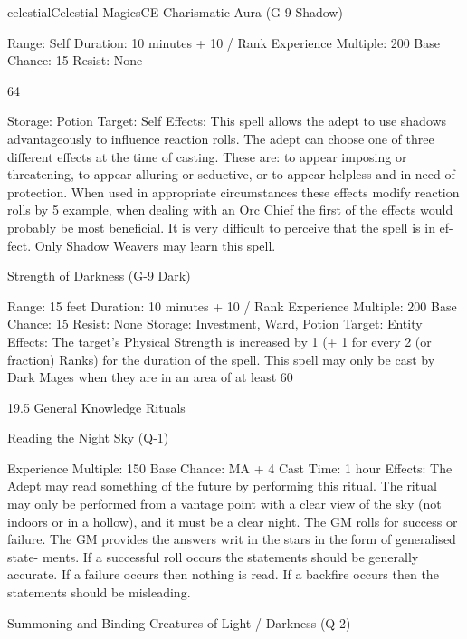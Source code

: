 \begin{College}[1.3]{celestial}{Celestial Magics}{CE}
Charismatic Aura (G-9 Shadow) 

Range: Self 
Duration: 10 minutes + 10 / Rank 
Experience Multiple: 200 
Base Chance: 15%
Resist: None 

64 

Storage: Potion 
Target: Self 
Effects: This spell allows the adept to use shadows 
advantageously  to  influence  reaction  rolls.  The 
adept  can  choose  one  of  three  different  effects  at 
the  time  of  casting.  These  are:  to  appear  imposing 
or threatening, to appear alluring or seductive, or to 
appear  helpless  and  in  need  of  protection.  When 
used  in  appropriate  circumstances  these  effects 
modify  reaction  rolls  by  5%
example,  when dealing with an Orc Chief the first 
of the effects would probably be most beneficial. It 
is  very  difficult  to  perceive  that  the  spell  is  in  ef-
fect. Only Shadow Weavers may learn this spell. 

Strength of Darkness (G-9 Dark) 

Range: 15 feet 
Duration: 10 minutes + 10 / Rank 
Experience Multiple: 200 
Base Chance: 15%
Resist: None 
Storage: Investment, Ward, Potion 
Target: Entity 
Effects: The target’s Physical Strength is increased 
by  1  (+  1  for  every  2  (or  fraction)  Ranks)  for  the 
duration  of  the  spell.  This  spell  may  only  be  cast 
by Dark Mages when they are in an area of at least 
60%

19.5 General Knowledge Rituals  

Reading the Night Sky (Q-1) 

Experience Multiple: 150 
Base Chance: MA + 4%
Cast Time: 1 hour 
Effects:  The  Adept  may  read  something  of  the 
future  by  performing  this  ritual.  The  ritual  may 
only  be  performed  from  a  vantage  point  with  a 
clear view  of the sky (not indoors or in a hollow), 
and  it  must  be  a  clear  night.  The  GM  rolls  for 
success  or  failure.  The  GM  provides  the  answers 
writ  in  the  stars  in  the  form  of  generalised  state-
ments.  If  a  successful  roll  occurs  the  statements 
should  be  generally  accurate.  If  a  failure  occurs 
then  nothing  is  read.  If  a  backfire  occurs  then  the 
statements should be misleading. 

Summoning and Binding Creatures of 
Light / Darkness (Q-2) 


\end{College}
